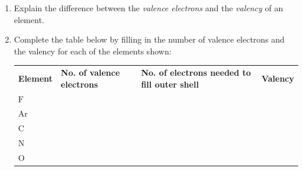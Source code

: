         \label{m38704*id139588}\begin{enumerate}[noitemsep, label=\textbf{\arabic*}. ] 
            \label{m38704*uid10}\item Explain the difference between the \textsl{valence electrons} and the \textsl{valency} of an element.\newline
\label{m38704*uid11}\item Complete the table below by filling in the number of valence electrons and the valency for each of the elements shown:
          \begin{table}[H]
        \begin{center}
      \label{m38704*id139625}
    \noindent
      \tablelasttail{}
      \begin{xtabular}[t]{|l|l|l|l|}\hline
        \textbf{Element} &
        \textbf{No. of valence electrons} &
        \textbf{No. of electrons needed to fill outer shell} &
        \textbf{Valency}%
     \tabularnewline{}
        $\mathrm{F}$ &
         &
         &
     \tabularnewline{}
        $\mathrm{Ar}$ &
         &
         &
     \tabularnewline{}
        $\mathrm{C}$ &
         &
         &
     \tabularnewline{}
        $\mathrm{N}$ &
         &
         &
     \tabularnewline{}
        $\mathrm{O}$ &
         &
         &
     \tabularnewline{}

\end{xtabular}
\end{center}
\end{table}
\end{enumerate}
